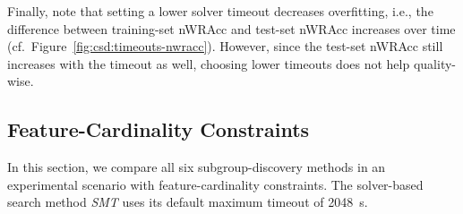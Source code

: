 \documentclass{article}
\theoremstyle{definition}
\begin{document}
Finally, note that setting a lower solver timeout decreases overfitting, i.e., the difference between training-set nWRAcc and test-set nWRAcc increases over time (cf.~Figure~\ref{fig:csd:timeouts-nwracc}).
However, since the test-set nWRAcc still increases with the timeout as well, choosing lower timeouts does not help quality-wise.

\subsection{Feature-Cardinality Constraints}
\label{sec:csd:evaluation:cardinality}

In this section, we compare all six subgroup-discovery methods in an experimental scenario with feature-cardinality constraints.
The solver-based search method \emph{SMT} uses its default maximum timeout of 2048~s.
\end{document}
